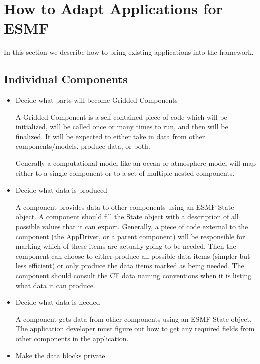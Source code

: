 
\section{How to Adapt Applications for ESMF}
\label{sec:Adoption}

In this section we describe how to bring existing applications 
into the framework.

\subsection{Individual Components}

\begin{itemize}

\item Decide what parts will become Gridded Components 

A Gridded Component is a self-contained
piece of code which will be initialized, will be called once or many times
to run, and then will be finalized.  It will be expected to either take in
data from other components/models, produce data, or both.

Generally a computational model like an ocean or atmosphere model will
map either to a single component or to a set of multiple nested
components.

\item Decide what data is produced 

A component provides data to other components using an ESMF State
object.  A component should fill the State object with a description of
all possible values that it can export.  Generally, a piece of code
external to the component (the AppDriver, or a parent component) will 
be responsible for marking which of these items are actually going to
be needed.  Then the component can choose to either produce all possible
data items (simpler but less efficient) or only produce the data items
marked as being needed.  The component should consult the CF data naming
conventions when it is listing what data it can produce.

\item Decide what data is needed 

A component gets data from other components using an ESMF State object.
The application developer must figure out how to get any required 
fields from other components in the application.

\item Make the data blocks private 


\end{itemize}

